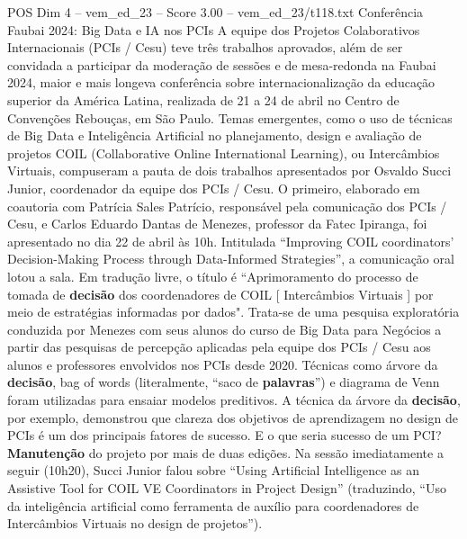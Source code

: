 \begin{textsample}{POS Dim 4 – vem\_ed\_23 – Score 3.00 – vem\_ed\_23/t118.txt}  \label{ex:f4_pos_090}
Conferência Faubai 2024: Big Data e IA nos PCIs A equipe dos Projetos Colaborativos Internacionais (PCIs / Cesu) teve três trabalhos aprovados, além de ser convidada a participar da moderação de sessões e de mesa-redonda na Faubai 2024, maior e mais longeva conferência sobre internacionalização da educação superior da América Latina, realizada de 21 a 24 de abril no Centro de Convenções Rebouças, em São Paulo.
Temas emergentes, como o uso de técnicas de Big Data e Inteligência Artificial no planejamento, design e avaliação de projetos COIL (Collaborative Online International Learning), ou Intercâmbios Virtuais, compuseram a pauta de dois trabalhos apresentados por Osvaldo Succi Junior, coordenador da equipe dos PCIs / Cesu.
O primeiro, elaborado em coautoria com Patrícia Sales Patrício, responsável pela comunicação dos PCIs / Cesu, e Carlos Eduardo Dantas de Menezes, professor da Fatec Ipiranga, foi apresentado no dia 22 de abril às 10h.
Intitulada “Improving COIL coordinators’ Decision-Making Process through Data-Informed Strategies”, a comunicação oral lotou a sala.
Em tradução livre, o título é “Aprimoramento do processo de tomada de \textbf{decisão} dos coordenadores de COIL [ Intercâmbios Virtuais ] por meio de estratégias informadas por dados".
Trata-se de uma pesquisa exploratória conduzida por Menezes com seus alunos do curso de Big Data para Negócios a partir das pesquisas de percepção aplicadas pela equipe dos PCIs / Cesu aos alunos e professores envolvidos nos PCIs desde 2020.
Técnicas como árvore da \textbf{decisão}, bag of words (literalmente, “saco de \textbf{palavras}”) e diagrama de Venn foram utilizadas para ensaiar modelos preditivos.
A técnica da árvore da \textbf{decisão}, por exemplo, demonstrou que clareza dos objetivos de aprendizagem no design de PCIs é um dos principais fatores de sucesso.
E o que seria sucesso de um PCI? \textbf{Manutenção} do projeto por mais de duas edições.
Na sessão imediatamente a seguir (10h20), Succi Junior falou sobre “Using Artificial Intelligence as an Assistive Tool for COIL VE Coordinators in Project Design” (traduzindo, “Uso da inteligência artificial como ferramenta de auxílio para coordenadores de Intercâmbios Virtuais no design de projetos”).

\end{textsample}

